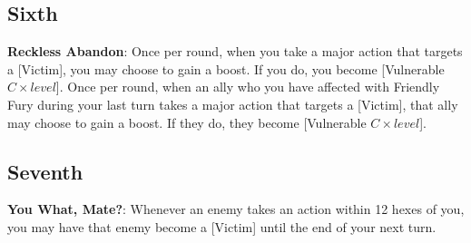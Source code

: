 \begin{multicols*}{2}
\subsection*{Sixth \Facet\perk}
\textbf{Reckless Abandon}: Once per round, when you take a major action that targets a [Victim], you may choose to gain a boost. If you do, you become [Vulnerable $C \times level$]. Once per round, when an ally who you have affected with Friendly Fury during your last turn takes a major action that targets a [Victim], that ally may choose to gain a boost. If they do, they become [Vulnerable $C \times level$].

\subsection*{Seventh \Facet\perk}
\textbf{You What, Mate?}: Whenever an enemy takes an action within 12 hexes of you, you may have that enemy become a [Victim] until the end of your next turn.
\end{multicols*}